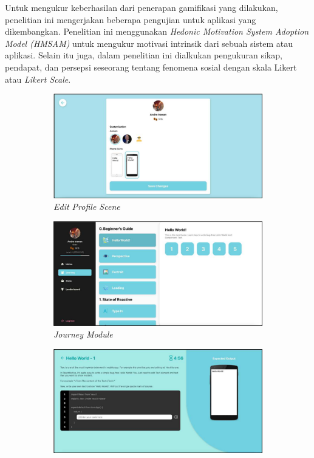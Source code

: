 Untuk mengukur keberhasilan dari penerapan gamifikasi yang dilakukan, penelitian ini mengerjakan beberapa pengujian untuk aplikasi yang dikembangkan.
Penelitian ini menggunakan \textit{Hedonic Motivation System Adoption Model (HMSAM)} untuk mengukur motivasi intrinsik dari sebuah sistem atau aplikasi.
Selain itu juga, dalam penelitian ini dialkukan pengukuran sikap, pendapat, dan persepsi seseorang tentang fenomena sosial dengan skala Likert atau \textit{Likert Scale}\cite{OctalysisFrameworkAndre}.

\begin{figure}[H]
	\centering
	\begin{subfigure}[b]{0.4\textwidth}
		\centering
		\includegraphics[width=\linewidth]{contents/chapter-2/images/Andre-a4.png}
		\caption{\textit{Edit Profile Scene}}
		\label{fig:sub-andre-a4}
	\end{subfigure}  
	\begin{subfigure}[b]{0.4\textwidth}
		\centering
		\includegraphics[width=\linewidth]{contents/chapter-2/images/Andre-a5.png}
		\caption{\textit{Journey Module}}
		\label{fig:sub-andre-a5}
	\end{subfigure}
	\hfill
	\begin{subfigure}[b]{0.4\textwidth}
		\centering
		\includegraphics[width=\linewidth]{contents/chapter-2/images/Andre-a6.png}

\end{subfigure}
\end{figure}
